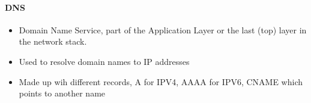 \documentclass[../CMPUT-404-Notes.tex]{subfiles}
\begin{document}
  \paragraph{DNS}
  \begin{itemize}
    \item Domain Name Service, part of the Application Layer or the last (top) layer in the network stack.
    \item Used to resolve domain names to IP addresses
    \item Made up wih different records, A for IPV4, AAAA for IPV6, CNAME which points to another name
  \end{itemize}
\end{document}
